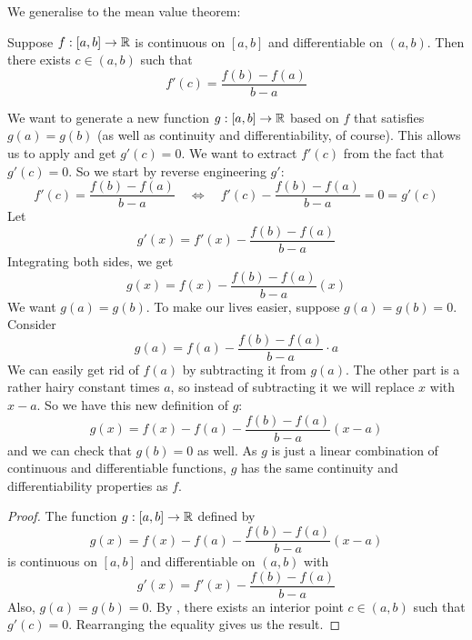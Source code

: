 We generalise  to the mean value theorem:
\begin{theorem}
  \label{thm:mean-value}
  Suppose $f: [a, b] \to \mathbb{R}$ is continuous on $[a, b]$ and differentiable on $(a, b)$. Then there exists $c \in (a, b)$ such that
  \[
    f'(c) = \frac{f(b) - f(a)}{b - a}
  \]
\end{theorem}
\begin{intuition}
  We want to generate a new function $g: [a, b] \to \mathbb{R}$ based on $f$ that satisfies $g(a) = g(b)$ (as well as continuity and differentiability, of course). This allows us to apply  and get $g'(c) = 0$. We want to extract $f'(c)$ from the fact that $g'(c) = 0$. So we start by reverse engineering $g'$:
  \[
    f'(c) = \frac{f(b) - f(a)}{b - a} \quad \iff \quad f'(c) - \frac{f(b) - f(a)}{b - a} = 0 = g'(c)
  \]
  Let 
  \[
    g'(x) = f'(x) - \frac{f(b) - f(a)}{b - a}
  \]
  Integrating both sides, we get
  \[
    g(x) = f(x) - \frac{f(b) - f(a)}{b - a}(x)
  \]
  We want $g(a) = g(b)$. To make our lives easier, suppose $g(a) = g(b) = 0$. Consider
  \[
    g(a) = f(a) - \frac{f(b) - f(a)}{b - a} \cdot a
  \]
  We can easily get rid of $f(a)$ by subtracting it from $g(a)$. The other part is a rather hairy constant times $a$, so instead of subtracting it we will replace $x$ with $x - a$. So we have this new definition of $g$:
  \[
    g(x) = f(x) - f(a) - \frac{f(b) - f(a)}{b - a}(x - a)
  \]
  and we can check that $g(b) = 0$ as well. As $g$ is just a linear combination of continuous and differentiable functions, $g$ has the same continuity and differentiability properties as $f$.
\end{intuition}
\begin{proof}
  The function $g: [a, b] \to \mathbb{R}$ defined by 
  \[
    g(x) = f(x) - f(a) - \frac{f(b) - f(a)}{b - a}(x - a)
  \]
  is continuous on $[a, b]$ and differentiable on $(a, b)$ with
  \[
    g'(x) = f'(x) - \frac{f(b) - f(a)}{b - a}
  \]
  Also, $g(a) = g(b) = 0$. By , there exists an interior point $c \in (a, b)$ such that $g'(c) = 0$. Rearranging the equality gives us the result.
\end{proof}


